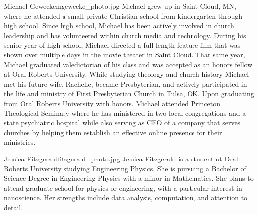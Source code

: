 \begin{authorbio}{Michael Gewecke}{mgewecke_photo.jpg}
Michael grew up in Saint Cloud, MN, where he attended a small private Christian school from kindergarten through high school.   Since high school, Michael has been actively involved in church leadership and has volunteered within church media and technology.  During his senior year of high school, Michael directed a full length feature film that was shown over multiple days in the movie theater in Saint Cloud.  That same year, Michael graduated valedictorian of his class and was accepted as an honors fellow at Oral Roberts University.  While studying theology and church history Michael met his future wife, Rachelle, became Presbyterian, and actively participated in the life and ministry of First Presbyterian Church in Tulsa, OK.  Upon graduating from Oral Roberts University with honors, Michael attended Princeton Theological Seminary where he has ministered in two local congregations and a state psychiatric hospital while also serving as CEO of a company that serves churches by helping them establish an effective online presence for their ministries.  
\end{authorbio}

\begin{authorbio}{Jessica Fitzgerald}{fitzgerald_photo.jpg}
Jessica Fitzgerald is a student at Oral Roberts University studying Engineering Physics.  She is pursuing a Bachelor of Science Degree in Engineering Physics with a minor in Mathematics. She plans to attend graduate school for physics or engineering, with a particular interest in nanoscience. Her strengths include data analysis, computation, and attention to detail.
\end{authorbio}

